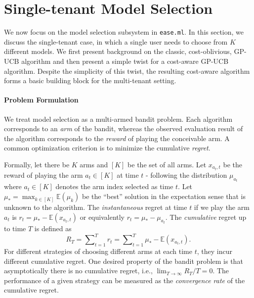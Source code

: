 \documentclass[letterpaper]{vldb}
\newcommand{\eml}{\texttt{ease.ml}\xspace}
\newcommand{\E}{\mathbb{E}}
\begin{document}
\section{Single-tenant Model Selection} \label{sec:singletenant}

We now focus on the model selection subsystem in \eml. In this section,
we discuss the single-tenant case, in which a single user needs to
choose from $K$ different models. We first present background on
the classic, cost-oblivious, GP-UCB algorithm and then present a simple
twist for a cost-aware GP-UCB algorithm. Despite the simplicity of
this twist, the resulting cost-aware algorithm forms a basic building
block for the multi-tenant setting.

\vspace{-1em}
\paragraph*{Problem Formulation} We treat
model selection as a multi-armed bandit problem.
Each algorithm corresponds to an \emph{arm} of 
the bandit, whereas the observed evaluation result of 
the algorithm corresponds to the \emph{reward} of playing the conceivable arm.
A common optimization criterion is to minimize the cumulative
\emph{regret}.


Formally, let there be $K$ arms and $[K]$ be the set of
all arms. Let $x_{a_t, t}$ be the reward of playing the arm $a_t\in[K]$
at time $t$ - following the distribution $\mu_{a_t}$ where $a_t \in [K]$ denotes the arm index selected as time $t$. Let $\mu_*=\max_{k\in[K]}\mathbb{E}(\mu_k)$ be the ``best'' solution in the expectation sense that is unknown to the algorithm.
The {\em instantaneous} regret at time $t$ if we
play the arm $a_t$ is $r_t=\mu_*-\E(x_{a_t, t})$ or equivalently $r_t = \mu_*-\mu_{a_t}$.
The {\em cumulative} regret up to time $T$ is defined as
\[
R_{T}=\sum\nolimits_{t=1}^{T}r_t = \sum\nolimits_{t=1}^{T} \mu_*-\E(x_{a_t, t}) .
\]
For different strategies of choosing different arms at
each time $t$, they incur different cumulative regret.
One desired property of the bandit problem is 
that asymptotically there is no cumulative regret, i.e.,
$\lim\nolimits_{T\to\infty}R_T/T=0.$ The performance
of a given strategy can be measured as the {\em convergence rate}
of the cumulative regret.


\vspace{-1em}
\end{document}
